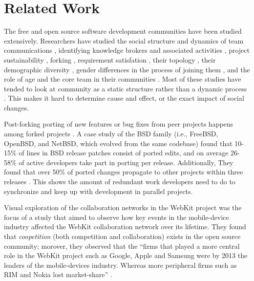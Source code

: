 \documentclass{acm_proc_article-sp}
\begin{document}
\section{Related Work}
\label{relatedwork}

The free and open source software development communities have been studied extensively. Researchers have studied the social structure and dynamics of team communications \cite{Bird}\cite{Guzzi}\cite{HowisonSocialDynamics}\cite{HowisonFlossMole}\cite{Nakakoji}, identifying knowledge brokers and associated activities \cite{Sowe}, project sustainability \cite{Nakakoji}\cite{NymanForkingSustainability}, forking \cite{NymanCodeForking}, requirement satisfation \cite{Ernst}, their topology \cite{Bird}, their demographic diversity \cite{Kunegis}, gender differences in the process of joining them \cite{Kuechler}, and the role of age and the core team in their communities \cite{AzarbakhtOSS2014}\cite{AzarbakhtINSNA2014}\cite{DavidsonVLHCC2014}\cite{Torres}. Most of these studies have tended to look at community as a static structure rather than a dynamic process \cite{CrowstonFLOSSWhatWeKnow}. This makes it hard to determine cause and effect, or the exact impact of social changes.

Post-forking porting of new features or bug fixes from peer projects happens among forked projects \cite{Baishakhi}. A case study of the BSD family (i.e., FreeBSD, OpenBSD, and NetBSD, which evolved from the same codebase) found that 10-15\% of lines in BSD release patches consist of ported edits, and on average 26-58\% of active developers take part in porting per release. Additionally, They found that over 50\% of ported changes propagate to other projects within three releases \cite{Baishakhi}. This shows the amount of redundant work developers need to do to synchronize and keep up with development in parallel projects. 

Visual exploration of the collaboration networks in the WebKit project was the focus of a study that aimed to observe how key events in the mobile-device industry affected the WebKit collaboration network over its lifetime. \cite{JoseWebKit} They found that \textit{coopetition} (both competition and collaboration) exists in the open source community; morover, they observed that the ``firms that played a more central role in the WebKit project such as Google, Apple and Samsung were by 2013 the leaders of the mobile-devices industry. Whereas more peripheral firms such as RIM and Nokia lost market-share'' \cite{JoseWebKit}.
\end{document}
